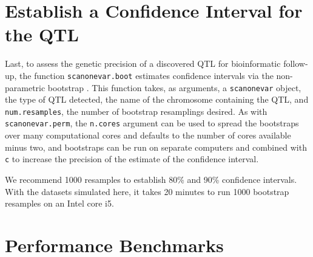 \documentclass[9pt,twocolumn,twoside]{gsag3jnl}
\begin{document}
\section{Establish a Confidence Interval for the QTL}

Last, to assess the genetic precision of a discovered QTL for bioinformatic follow-up, the function \texttt{scanonevar.boot} estimates confidence intervals via the non-parametric bootstrap \citep{Visscher1996}.
This function takes, as arguments, a \texttt{scanonevar} object, the type of QTL detected, the name of the chromosome containing the QTL, and \texttt{num.resamples}, the number of bootstrap resamplings desired.
As with \texttt{scanonevar.perm}, the \texttt{n.cores} argument can be used to spread the bootstraps over many computational cores and defaults to the number of cores available minus two, and bootstraps can be run on separate computers and combined with \texttt{c} to increase the precision of the estimate of the confidence interval.

We recommend 1000 resamples to establish 80\% and 90\% confidence intervals.
With the datasets simulated here, it takes 20 minutes to run 1000 bootstrap resamples on an Intel core i5.






\section*{Performance Benchmarks}
\end{document}
